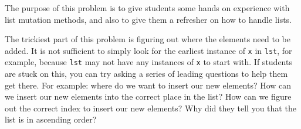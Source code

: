 \begin{questionmeta}
    The purpose of this problem is to give students some hands on experience with list mutation methods, and also to give them a refresher on how to handle lists.

    The trickiest part of this problem is figuring out where the elements need to be added. It is not sufficient to simply look for the earliest instance of \lstinline{x} in \lstinline{lst}, for example, because \lstinline{lst} may not have any instances of \lstinline{x} to start with. If students are stuck on this, you can try asking a series of leading questions to help them get there. For example: where do we want to insert our new elements? How can we insert our new elements into the correct place in the list? How can we figure out the correct index to insert our new elements? Why did they tell you that the list is in ascending order? 
\end{questionmeta}